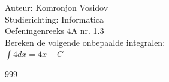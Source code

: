 \documentclass[a4paper]{article}
\newcommand{\dint}{\displaystyle\int}
\begin{document}
	
	\noindent \large Auteur: Komronjon Vosidov \\
	\noindent \large Studierichting: Informatica\\
	\noindent \large Oefeningenreeks 4A nr. 1.3\\
	
	
	\medskip
	\normalsize
	Bereken de volgende onbepaalde integralen:\\
	
	$\dint 4 dx = 4x + C$ \\ 
	
	
	
	
	
	
	\begin{thebibliography}{999}
	\end{thebibliography}		
\end{document}
